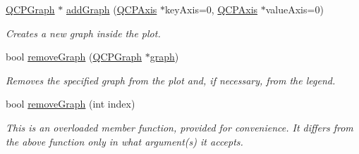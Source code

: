 \begin{DoxyCompactItemize}
\item 
\hyperlink{a00031}{Q\+C\+P\+Graph} $\ast$ \hyperlink{a00116_a6fb2873d35a8a8089842d81a70a54167}{add\+Graph} (\hyperlink{a00025}{Q\+C\+P\+Axis} $\ast$key\+Axis=0, \hyperlink{a00025}{Q\+C\+P\+Axis} $\ast$value\+Axis=0)
\begin{DoxyCompactList}\small\item\em Creates a new graph inside the plot. \end{DoxyCompactList}\item 
bool \hyperlink{a00116_a903561be895fb6528a770d66ac5e6713}{remove\+Graph} (\hyperlink{a00031}{Q\+C\+P\+Graph} $\ast$\hyperlink{a00116_ab2463cfbef0d48d1829418647431bf35}{graph})
\begin{DoxyCompactList}\small\item\em Removes the specified {\itshape graph} from the plot and, if necessary, from the legend. \end{DoxyCompactList}\item 
bool \hyperlink{a00116_a9554b3d2d5b10c0f884bd4010b6c192c}{remove\+Graph} (int index)
\begin{DoxyCompactList}\small\item\em This is an overloaded member function, provided for convenience. It differs from the above function only in what argument(s) it accepts.


\end{DoxyCompactList}
\end{DoxyCompactItemize}
